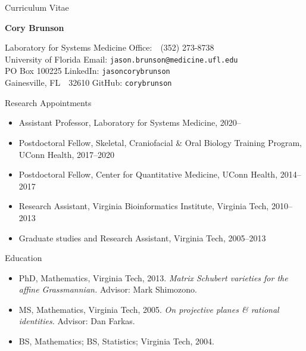 \documentclass[10pt,a4paper]{article}
\begin{document}
\frenchspacing
\pagestyle{empty}
\setlength{\parindent}{0cm}

\centerline{\sc Curriculum Vitae}
\vspace{.25cm}
\centerline{\large\bfseries Cory Brunson}

\vspace{.75cm}
Laboratory for Systems Medicine \hfill Office:\ \ (352) 273-8738 \\
University of Florida \hfill Email: {\tt\small jason.brunson@medicine.ufl.edu} \\
PO Box 100225  \hfill LinkedIn: {\tt\small\nolinkurl{jasoncorybrunson}} \\
Gainesville, FL\ \ 32610 \hfill GitHub: {\tt\small\nolinkurl{corybrunson}}

\vspace{.25cm}
{\sc Research Appointments}
\begin{itemize}[label=$\circ$,nolistsep]
\item
Assistant Professor, Laboratory for Systems Medicine, 2020--
\item
Postdoctoral Fellow, Skeletal, Craniofacial \& Oral Biology Training Program, UConn Health, 2017--2020
\item
Postdoctoral Fellow, Center for Quantitative Medicine, UConn Health, 2014--2017
\item
Research Assistant, Virginia Bioinformatics Institute, Virginia Tech, 2010--2013
\item
Graduate studies and Research Assistant, Virginia Tech, 2005--2013
\end{itemize}

\vspace{.25cm}
{\sc Education}
\begin{itemize}[label=$\circ$,nolistsep]
\item
PhD, Mathematics, Virginia Tech, 2013.
{\itshape Matrix Schubert varieties for the affine Grassmannian.}
Advisor: Mark Shimozono.
\item
MS, Mathematics, Virginia Tech, 2005.
{\itshape On projective planes \& rational identities.}
Advisor: Dan Farkas.
\item
BS, Mathematics; BS, Statistics; Virginia Tech, 2004.
\end{itemize}

\end{document}
